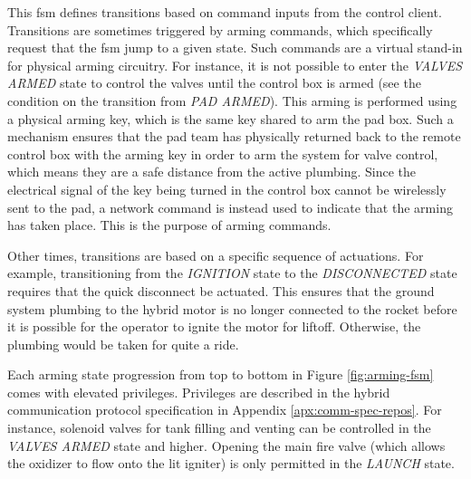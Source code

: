 This \gls{fsm} defines transitions based on command inputs from the control client. Transitions are sometimes triggered
by arming commands, which specifically request that the \gls{fsm} jump to a given state. Such commands are a virtual
stand-in for physical arming circuitry. For instance, it is not possible to enter the \textit{VALVES ARMED} state to
control the valves until the control box is armed (see the condition on the transition from \textit{PAD ARMED}). This
arming is performed using a physical arming key, which is the same key shared to arm the pad box. Such a mechanism
ensures that the pad team has physically returned back to the remote control box with the arming key in order to arm
the system for valve control, which means they are a safe distance from the active plumbing. Since the electrical
signal of the key being turned in the control box cannot be wirelessly sent to the pad, a network command is instead
used to indicate that the arming has taken place. This is the purpose of arming commands.

Other times, transitions are based on a specific sequence of actuations. For example, transitioning from the
\textit{IGNITION} state to the \textit{DISCONNECTED} state requires that the quick disconnect be actuated. This ensures
that the ground system plumbing to the hybrid motor is no longer connected to the rocket before it is possible for the
operator to ignite the motor for liftoff. Otherwise, the plumbing would be taken for quite a ride.

Each arming state progression from top to bottom in Figure \ref{fig:arming-fsm} comes with elevated privileges.
Privileges are described in the hybrid communication protocol specification in Appendix \ref{apx:comm-spec-repos}. For
instance, solenoid valves for tank filling and venting can be controlled in the \textit{VALVES ARMED} state and higher.
\cite{hybrid-comms} Opening the main fire valve (which allows the oxidizer to flow onto the lit igniter) is only
permitted in the \textit{LAUNCH} state.
